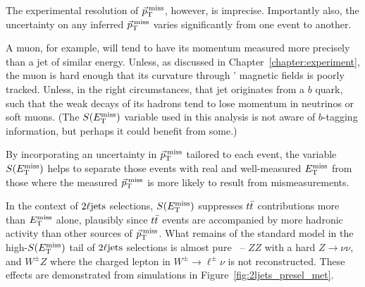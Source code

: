 The experimental resolution of $\vec p_\mathrm{T}^\mathrm{\:miss}$, however, is imprecise.
Importantly also, the uncertainty on any inferred $\vec p_\mathrm{T}^\mathrm{\:miss}$ varies
significantly from one event to another.

A muon, for example, will tend to have its momentum measured more precisely
than a jet of similar energy.
Unless, as discussed in Chapter~\ref{chapter:experiment}, the muon is hard
enough that its curvature through \atlas' magnetic fields is poorly tracked.
Unless, in the right circumstances, that jet originates from a $b$ quark,
such that the weak decays of its hadrons tend to lose momentum in
neutrinos or soft muons. (The $S(E_\mathrm{T}^\mathrm{miss})$ variable used in this analysis is not
aware of $b$-tagging information, but perhaps it could benefit from some.)

By incorporating an uncertainty in $\vec p_\mathrm{T}^\mathrm{\:miss}$ tailored to each event, the
variable $S(E_\mathrm{T}^\mathrm{miss})$ helps to separate those events with real and well-measured
$E_\mathrm{T}^\mathrm{miss}$ from those where the measured $\vec p_\mathrm{T}^\mathrm{\:miss}$ is more likely to result from
mismeasurements.

In the context of $2\ell\mathrm{jets}$ selections, $S(E_\mathrm{T}^\mathrm{miss})$ suppresses $t\bar t$
contributions more than $E_\mathrm{T}^\mathrm{miss}$ alone, plausibly since $t\bar t$ events are
accompanied by more hadronic activity than other sources of $\vec p_\mathrm{T}^\mathrm{\:miss}$.
What remains of the standard model in the high-$S(E_\mathrm{T}^\mathrm{miss})$ tail of $2\ell\mathrm{jets}$
selections is almost pure \diboson\ -- $ZZ$ with a hard $Z\rightarrow \nu\nu$,
and $W^\pm Z$ where the charged lepton in $W^\pm\rightarrow\ell^\pm\nu$
is not reconstructed.
These effects are demonstrated from simulations in
Figure~\ref{fig:2ljets_presel_met}.

